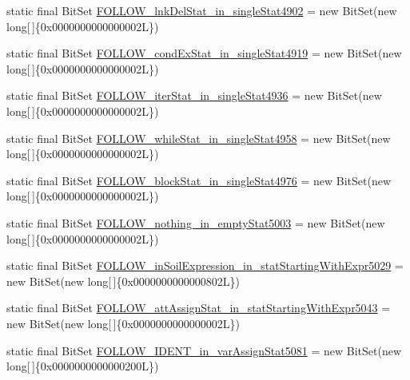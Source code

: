 \begin{DoxyCompactItemize}
static final Bit\-Set \hyperlink{classorg_1_1tzi_1_1use_1_1parser_1_1testsuite_1_1_test_suite_parser_a13e401f0fca92955eaab28391955ddcc}{F\-O\-L\-L\-O\-W\-\_\-lnk\-Del\-Stat\-\_\-in\-\_\-single\-Stat4902} = new Bit\-Set(new long\mbox{[}$\,$\mbox{]}\{0x0000000000000002\-L\})
\item 
static final Bit\-Set \hyperlink{classorg_1_1tzi_1_1use_1_1parser_1_1testsuite_1_1_test_suite_parser_ad422dda95adad23151a70c6fe9945b9d}{F\-O\-L\-L\-O\-W\-\_\-cond\-Ex\-Stat\-\_\-in\-\_\-single\-Stat4919} = new Bit\-Set(new long\mbox{[}$\,$\mbox{]}\{0x0000000000000002\-L\})
\item 
static final Bit\-Set \hyperlink{classorg_1_1tzi_1_1use_1_1parser_1_1testsuite_1_1_test_suite_parser_abb595f7891c22580835cf9718a0f0295}{F\-O\-L\-L\-O\-W\-\_\-iter\-Stat\-\_\-in\-\_\-single\-Stat4936} = new Bit\-Set(new long\mbox{[}$\,$\mbox{]}\{0x0000000000000002\-L\})
\item 
static final Bit\-Set \hyperlink{classorg_1_1tzi_1_1use_1_1parser_1_1testsuite_1_1_test_suite_parser_a446ca5a8b0d84c439f32efb5e096fa99}{F\-O\-L\-L\-O\-W\-\_\-while\-Stat\-\_\-in\-\_\-single\-Stat4958} = new Bit\-Set(new long\mbox{[}$\,$\mbox{]}\{0x0000000000000002\-L\})
\item 
static final Bit\-Set \hyperlink{classorg_1_1tzi_1_1use_1_1parser_1_1testsuite_1_1_test_suite_parser_a6283ef1efa469cb8d3923010ffca6607}{F\-O\-L\-L\-O\-W\-\_\-block\-Stat\-\_\-in\-\_\-single\-Stat4976} = new Bit\-Set(new long\mbox{[}$\,$\mbox{]}\{0x0000000000000002\-L\})
\item 
static final Bit\-Set \hyperlink{classorg_1_1tzi_1_1use_1_1parser_1_1testsuite_1_1_test_suite_parser_a88c2d321cb5159b55f092b0f13cf56e5}{F\-O\-L\-L\-O\-W\-\_\-nothing\-\_\-in\-\_\-empty\-Stat5003} = new Bit\-Set(new long\mbox{[}$\,$\mbox{]}\{0x0000000000000002\-L\})
\item 
static final Bit\-Set \hyperlink{classorg_1_1tzi_1_1use_1_1parser_1_1testsuite_1_1_test_suite_parser_a8cd872c1867e289bd2936562fd6c4aaf}{F\-O\-L\-L\-O\-W\-\_\-in\-Soil\-Expression\-\_\-in\-\_\-stat\-Starting\-With\-Expr5029} = new Bit\-Set(new long\mbox{[}$\,$\mbox{]}\{0x0000000000000802\-L\})
\item 
static final Bit\-Set \hyperlink{classorg_1_1tzi_1_1use_1_1parser_1_1testsuite_1_1_test_suite_parser_a062d48739808f8016a1d643cf8de5909}{F\-O\-L\-L\-O\-W\-\_\-att\-Assign\-Stat\-\_\-in\-\_\-stat\-Starting\-With\-Expr5043} = new Bit\-Set(new long\mbox{[}$\,$\mbox{]}\{0x0000000000000002\-L\})
\item 
static final Bit\-Set \hyperlink{classorg_1_1tzi_1_1use_1_1parser_1_1testsuite_1_1_test_suite_parser_a306b351c2285f531c4e8de32414230e3}{F\-O\-L\-L\-O\-W\-\_\-\-I\-D\-E\-N\-T\-\_\-in\-\_\-var\-Assign\-Stat5081} = new Bit\-Set(new long\mbox{[}$\,$\mbox{]}\{0x0000000000000200\-L\})

\end{DoxyCompactItemize}
